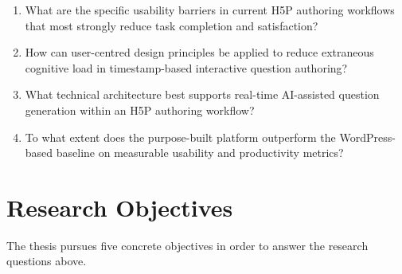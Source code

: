 \begin{enumerate}[label=RQ\arabic*.]
  \item What are the specific usability barriers in current H5P authoring
  workflows that most strongly reduce task completion and satisfaction?
  \item How can user-centred design principles be applied to reduce
  extraneous cognitive load in timestamp-based interactive question
  authoring?
  \item What technical architecture best supports real-time AI-assisted
  question generation within an H5P authoring workflow?
  \item To what extent does the purpose-built platform outperform the
  WordPress-based baseline on measurable usability and productivity metrics?
\end{enumerate}

\section{Research Objectives}

The thesis pursues five concrete objectives in order to answer the research
questions above.

